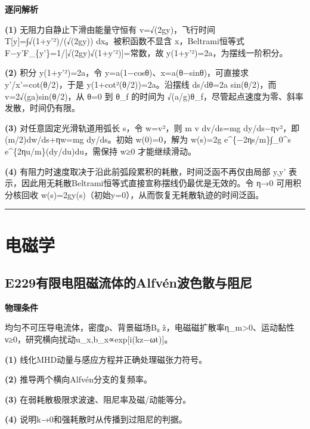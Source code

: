 \documentclass[UTF8,a4paper,11pt,oneside,openany]{ctexbook}
\begin{document}
\par\medskip\noindent\textbf{逐问解析}
\par\noindent\textbf{(1)} 无阻力自静止下滑由能量守恒有 v=√(2gy)，飞行时间 T[y]=∫√(1+y'²)/(√(2gy)) dx。被积函数不显含 x，Beltrami恒等式 F−y'F\_\{y'\}=1/[√(2gy)√(1+y'²)]=常数，故 y(1+y'²)=2a，为摆线一阶积分。
\par\noindent\textbf{(2)} 积分 y(1+y'²)=2a，令 y=a(1−cosθ)、x=a(θ−sinθ)，可直接求 y'/x'=cot(θ/2)，于是 y(1+cot²(θ/2))=2a。沿摆线 ds/dθ=2a sin(θ/2)，而 v=2√(ga)sin(θ/2)，从 θ=0 到 θ\_f 的时间为 √(a/g)θ\_f，尽管起点速度为零、斜率发散，时间仍有限。
\par\noindent\textbf{(3)} 对任意固定光滑轨道用弧长 s，令 w=v²，则 m v dv/ds=mg dy/ds−ηv²，即 (m/2)dw/ds+ηw=mg dy/ds。初始 w(0)=0，解为 w(s)=2g e\textasciicircum{}\{−2ηs/m\}∫\_0\textasciicircum{}s e\textasciicircum{}\{2ηu/m\}(dy/du)du，需保持 w≥0 才能继续滑动。
\par\noindent\textbf{(4)} 有阻力时速度取决于沿此前弧段累积的耗散，时间泛函不再仅由局部 y,y' 表示，因此用无耗散Beltrami恒等式直接宣称摆线仍最优是无效的。令 η→0 可用积分核回收 w(s)=2gy(s)（初始y=0），从而恢复无耗散轨迹的时间泛函。

\par\bigskip\hrule\bigskip
\chapter{电磁学}
\section*{E229\quad 有限电阻磁流体的Alfvén波色散与阻尼}
\textbf{物理条件}\par 均匀不可压导电流体，密度ρ、背景磁场B₀ ẑ，电磁磁扩散率η\_m>0、运动黏性ν≥0，研究横向扰动u\_x,b\_x∝exp[i(kz−ωt)]。
\par\noindent\textbf{(1)} 线化MHD动量与感应方程并正确处理磁张力符号。
\par\noindent\textbf{(2)} 推导两个横向Alfvén分支的复频率。
\par\noindent\textbf{(3)} 在弱耗散极限求波速、阻尼率及磁/动能等分。
\par\noindent\textbf{(4)} 说明k→0和强耗散时从传播到过阻尼的判据。
\end{document}
